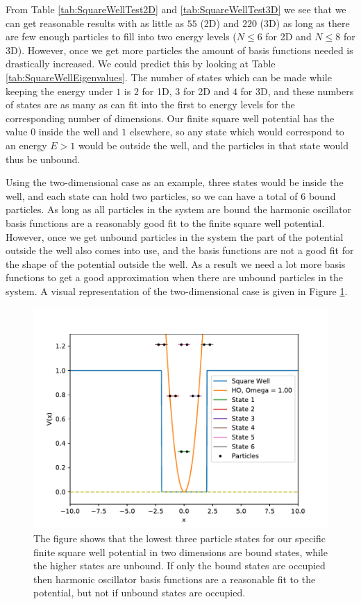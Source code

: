 \documentclass[../main.tex]{subfiles}
\begin{document}
From Table \ref{tab:SquareWellTest2D} and \ref{tab:SquareWellTest3D} we see that we can get reasonable results with as little as $55$ (2D) and $220$ (3D) as long as there are few enough particles to fill into two energy levels ($N\leq 6$ for 2D and $N\leq 8$ for 3D). However, once we get more particles the amount of basis functions needed is drastically increased. We could predict this by looking at Table \ref{tab:SquareWellEigenvalues}. The number of states which can be made while keeping the energy under $1$ is $2$ for 1D, $3$ for 2D and $4$ for 3D, and these numbers of states are as many as can fit into the first to energy levels for the corresponding number of dimensions. Our finite square well potential has the value $0$ inside the well and $1$ elsewhere, so any state which would correspond to an energy $E>1$ would be outside the well, and the particles in that state would thus be unbound. 

Using the two-dimensional case as an example, three states would be inside the well, and each state can hold two particles, so we can have a total of $6$ bound particles. As long as all particles in the system are bound the harmonic oscillator basis functions are a reasonably good fit to the finite square well potential. However, once we get unbound particles in the system the part of the potential outside the well also comes into use, and the basis functions are not a good fit for the shape of the potential outside the well. As a result we need a lot more basis functions to get a good approximation when there are unbound particles in the system. A visual representation of the two-dimensional case is given in Figure \ref{fig: FSW_energy_levels}.

\begin{figure}
\centering
\includegraphics[width=\linewidth]{figures/SW_Energy_Levels}
\caption{The figure shows that the lowest three particle states for our specific finite square well potential in two dimensions are bound states, while the higher states are unbound. If only the bound states are occupied then harmonic oscillator basis functions are a reasonable fit to the potential, but not if unbound states are occupied.}
\label{fig: FSW_energy_levels}
\end{figure}
\end{document}
